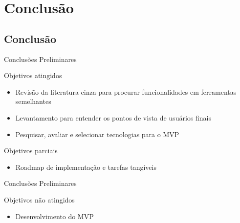 
\section{Conclusão}
\subsection*{Conclusão}


\begin{frame}{{\sffamily Conclusões Preliminares}}
\begin{block}{Objetivos atingidos}
    \begin{itemize}
        \item Revisão da literatura cinza para procurar funcionalidades em ferramentas semelhantes
        \item Levantamento para entender os pontos de vista de usuários finais
        \item Pesquisar, avaliar e selecionar tecnologias para o MVP
    \end{itemize}
\end{block}
\begin{block}{Objetivos parciais}
    \begin{itemize}
        \item Roadmap de implementação e tarefas tangíveis
    \end{itemize}
\end{block}
\end{frame}
\begin{frame}{{\sffamily Conclusões Preliminares}}
\begin{block}{Objetivos não atingidos}
    \begin{itemize}
        \item Desenvolvimento do MVP
    \end{itemize}
\end{block}
\end{frame}
